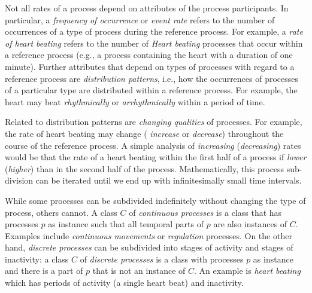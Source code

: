 \documentclass{bioinfo}
\begin{document}
Not all rates of a process depend on attributes of the process
participants. In particular, a {\em frequency of occurrence} or {\em
  event rate} refers to the number of occurrences of a type of process
during the reference process. For example, a {\em rate of heart
  beating} refers to the number of {\em Heart beating} processes that
occur within a reference process (e.g., a process containing the heart
with a duration of one minute). Further attributes that depend on
types of processes with regard to a reference process are {\em
  distribution patterns}, i.e., how the occurrences of processes of a
particular type are distributed within a reference process. For
example, the heart may beat {\em rhythmically} or {\em arrhythmically}
within a period of time.

Related to distribution patterns are {\em changing qualities} of
processes. For example, the rate of heart beating may change ({\em
  increase} or {\em decrease}) throughout the course of the reference
process. A simple analysis of {\em increasing} ({\em decreasing})
rates would be that the rate of a heart beating within the first half
of a process if {\em lower} ({\em higher}) than in the second half of
the process. Mathematically, this process sub-division can be iterated
until we end up with infinitesimally small time intervals.

While some processes can be subdivided indefinitely without changing
the type of process, others cannot. A class $C$ of {\em continuous
  processes} is a class that has processes $p$ as instance such that
all temporal parts of $p$ are also instances of $C$. Examples include
{\em continuous movements} or {\em regulation} processes. On the other
hand, {\em discrete processes} can be subdivided into stages of
activity and stages of inactivity: a class $C$ of {\em discrete
  processes} is a class with processes $p$ as instance and there is a
part of $p$ that is not an instance of $C$. An example is {\em heart
  beating} which has periods of activity (a single heart beat) and
inactivity.


\end{document}
